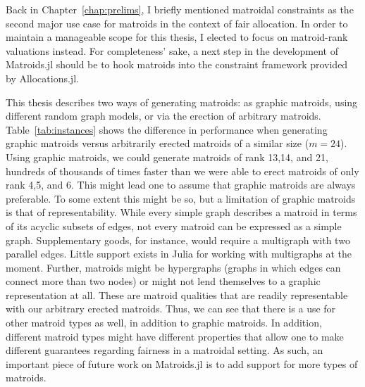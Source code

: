 Back in Chapter~\ref{chap:prelims}, I briefly mentioned matroidal constraints as the second major use case for matroids in the context of fair allocation. In order to maintain a manageable scope for this thesis, I elected to focus on matroid-rank valuations instead. For completeness' sake, a next step in the development of Matroids.jl should be to hook matroids into the constraint framework provided by Allocations.jl.

This thesis describes two ways of generating matroids: as graphic matroids, using different random graph models, or via the erection of arbitrary matroids. Table~\ref{tab:instances} shows the difference in performance when generating graphic matroids versus arbitrarily erected matroids of a similar size ($m=24$). Using graphic matroids, we could generate matroids of rank 13,14, and 21, hundreds of thousands of times faster than we were able to erect matroids of only rank 4,5, and 6. This might lead one to assume that graphic matroids are always preferable. To some extent this might be so, but a limitation of graphic matroids is that of representability. While every simple graph describes a matroid in terms of its acyclic subsets of edges, not every matroid can be expressed as a simple graph. Supplementary goods, for instance, would require a multigraph with two parallel edges. Little support exists in Julia for working with multigraphs at the moment. Further, matroids might be hypergraphs (graphs in which edges can connect more than two nodes) or might not lend themselves to a graphic representation at all. These are matroid qualities that are readily representable with our arbitrary erected matroids. Thus, we can see that there is a use for other matroid types as well, in addition to graphic matroids. In addition, different matroid types might have different properties that allow one to make different guarantees regarding fairness in a matroidal setting. As such, an important piece of future work on Matroids.jl is to add support for more types of matroids.
